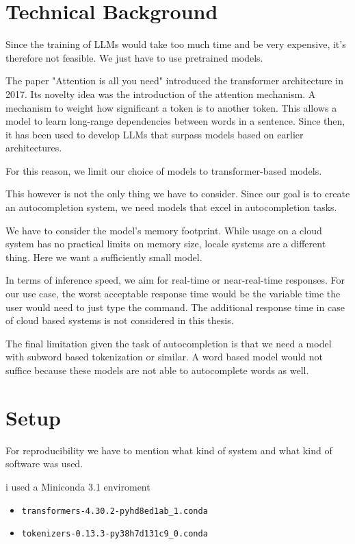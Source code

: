 
\section{Technical Background}
Since the training of LLMs would take too much time and be very expensive, it's therefore not feasible. We just have to use pretrained models.


 

The paper "Attention is all you need" \cite{NIPS2017_3f5ee243}  introduced the transformer architecture in 2017. Its novelty idea was the introduction of the attention mechanism. A mechanism to weight how significant a token is to another token. This allows a model to learn long-range dependencies between words in a sentence. Since then, it has been used to develop LLMs that surpass models based on earlier architectures.

For this reason, we limit our choice of models to transformer-based models.

This however is not the only thing we have to consider. Since our goal is to create an autocompletion system, we need models that excel in autocompletion tasks.


We have to consider the model's memory footprint. While usage on a cloud system has no practical limits on memory size, locale systems are a different thing.
Here we want a sufficiently small model.


In terms of inference speed, we aim for real-time or near-real-time responses. For our       use case, the worst acceptable response time would be the variable time the user would need to just type the command. The additional response time in case of cloud based systems is not considered in this thesis.


The final limitation given the task of autocompletion is that we need a model with subword based tokenization or similar. A word based model would not suffice because these models are not able to autocomplete words as well.

\section{Setup}\raggedbottom
For reproducibility we have to mention what kind of system and what kind of software was used.



i used a Miniconda 3.1 enviroment

\begin{itemize}
\item \begin{verbatim}
transformers-4.30.2-pyhd8ed1ab_1.conda
\end{verbatim}

\item \begin{verbatim}
tokenizers-0.13.3-py38h7d131c9_0.conda
\end{verbatim}
  
\end{itemize}

